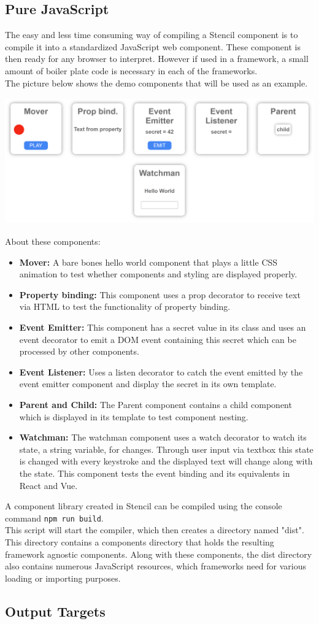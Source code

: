 \subsection{Pure JavaScript}
The easy and less time consuming way of compiling a Stencil component is to compile it into a standardized JavaScript web component. These component is then ready for any browser to interpret. However if used in a framework, a small amount of boiler plate code is necessary in each of the frameworks.\\[0.5cm]
%
The picture below shows the demo components that will be used as an example. 
\includegraphics [height=6.2cm, width=15cm] {images/demopage}
About these components:
\begin{itemize}
\item \textbf{Mover:} A bare bones hello world component that plays a little CSS animation to test whether components and styling are displayed properly.
\item \textbf{Property binding:} This component uses a prop decorator to receive text via HTML to test the functionality of property binding.
\item \textbf{Event Emitter:} This component has a secret value in its class and uses an event decorator to emit a DOM event containing this secret which can be processed by other components.
\item \textbf{Event Listener:} Uses a listen decorator to catch the event emitted by the event emitter component and display the secret in its own template.
\item \textbf{Parent and Child:} The Parent component contains a child component which is displayed in its template to test component nesting.
\item \textbf{Watchman:} The watchman component uses a watch decorator to watch its state, a string variable, for changes. Through user input via textbox this state is changed with every keystroke and the displayed text will change along with the state. This component tests the event binding and its equivalents in React and Vue.
\end{itemize}
A component library created in Stencil can be compiled using the console command \verb+npm run build+.\\
This script will start the compiler, which then creates a directory named "dist". This directory contains a components directory that holds the resulting framework agnostic components. Along with these components, the dist directory also contains numerous JavaScript resources, which frameworks need for various loading or importing purposes.

\subsection{Output Targets}
